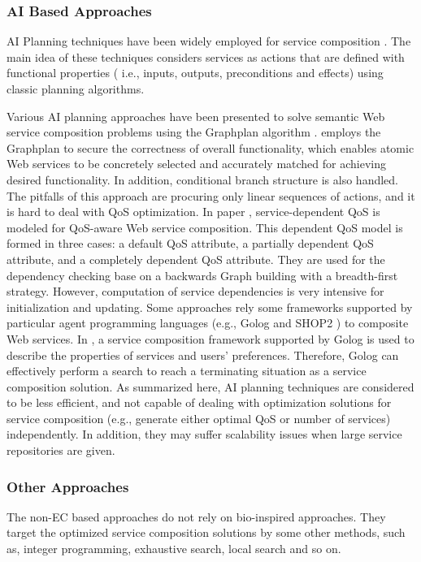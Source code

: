 \subsubsection{AI Based Approaches}

AI Planning techniques have been widely employed for service composition \cite{markou2015non,peer2005web}. The main idea of these techniques considers services as actions that are defined with functional properties ( i.e., inputs, outputs, preconditions and effects) using classic planning algorithms. 

Various AI planning approaches \cite{feng2013dynamic,huang2009effective,rao2006mixed,wang2013genetic, wang2014automated} have been presented to solve semantic Web service composition problems using the Graphplan algorithm \cite{blum1997fast}. \cite{wang2014automated} employs the Graphplan to secure the correctness of overall functionality, which enables atomic Web services to be concretely selected and accurately matched for achieving desired functionality. In addition, conditional branch structure is also handled. The pitfalls of this approach are procuring only linear sequences of actions, and it is hard to deal with QoS optimization. In paper \cite{feng2013dynamic}, service-dependent QoS is modeled for QoS-aware Web service composition. This dependent QoS model is formed in three cases: a default QoS attribute, a partially dependent QoS attribute, and a completely dependent QoS attribute. They are used for the dependency checking base on a backwards Graph building with a breadth-first strategy. However, computation of service dependencies is very intensive for initialization and updating. Some approaches \cite{lecue2007making,sohrabi2009Web} rely some frameworks supported by particular agent programming languages (e.g., Golog \cite{sohrabi2009Web}  and SHOP2 \cite{sirin2004htn}) to composite Web services. In \cite{sohrabi2009Web}, a service composition framework supported by Golog is used to describe the properties of services and users' preferences. Therefore, Golog can effectively perform a  search to reach a terminating situation as a service composition solution. As summarized here, AI planning techniques are considered to be less efficient, and not capable of dealing with optimization solutions for service composition (e.g., generate either optimal QoS or number of services) independently. In addition, they may suffer scalability issues when large service repositories are given. 

\subsubsection{Other Approaches}
The non-EC based approaches do not rely on bio-inspired approaches. They target the optimized service composition solutions by some other methods, such as, integer programming, exhaustive search, local search and so on.

